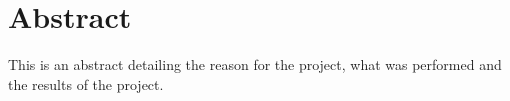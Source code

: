 \section*{Abstract}
This is an abstract detailing the reason for the project, what was performed and the results of the project.